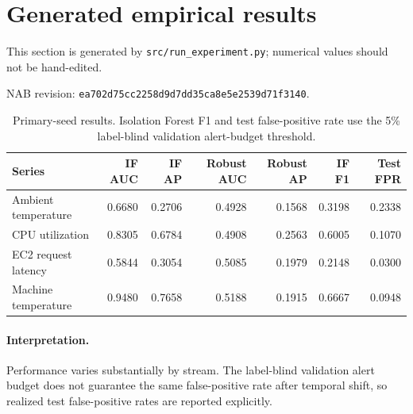 \section{Generated empirical results}
This section is generated by \texttt{src/run\_experiment.py}; numerical values should not be hand-edited.

NAB revision: \texttt{ea702d75cc2258d9d7dd35ca8e5e2539d71f3140}.

\begin{table}[htbp]
\centering
\small
\begin{tabular}{lrrrrrr}
\toprule
Series & IF AUC & IF AP & Robust AUC & Robust AP & IF F1 & Test FPR \\
\midrule
Ambient temperature & 0.6680 & 0.2706 & 0.4928 & 0.1568 & 0.3198 & 0.2338 \\
CPU utilization & 0.8305 & 0.6784 & 0.4908 & 0.2563 & 0.6005 & 0.1070 \\
EC2 request latency & 0.5844 & 0.3054 & 0.5085 & 0.1979 & 0.2148 & 0.0300 \\
Machine temperature & 0.9480 & 0.7658 & 0.5188 & 0.1915 & 0.6667 & 0.0948 \\
\bottomrule
\end{tabular}
\caption{Primary-seed results. Isolation Forest F1 and test false-positive rate use the 5\% label-blind validation alert-budget threshold.}
\label{tab:primary-results}
\end{table}

\paragraph{Interpretation.}
Performance varies substantially by stream. The label-blind validation alert budget does not guarantee the same false-positive rate after temporal shift, so realized test false-positive rates are reported explicitly.
